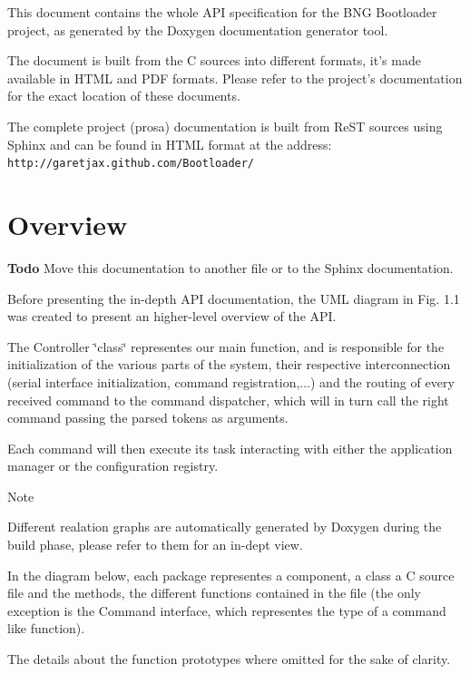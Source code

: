 This document contains the whole API specification for the BNG Bootloader project, as generated by the Doxygen documentation generator tool.

The document is built from the C sources into different formats, it's made available in HTML and PDF formats. Please refer to the project's documentation for the exact location of these documents.

The complete project (prosa) documentation is built from ReST sources using Sphinx and can be found in HTML format at the address: {\tt http://garetjax.github.com/Bootloader/}\section{Overview}\label{main_Overview}
\begin{Desc}
\item[{\bf Todo}]Move this documentation to another file or to the Sphinx documentation.\end{Desc}
Before presenting the in-\/depth API documentation, the UML diagram in Fig. 1.1 was created to present an higher-\/level overview of the API.

The {\ttfamily Controller} \char`\"{}class\char`\"{} representes our {\ttfamily main} function, and is responsible for the initialization of the various parts of the system, their respective interconnection (serial interface initialization, command registration,...) and the routing of every received command to the command dispatcher, which will in turn call the right command passing the parsed tokens as arguments.

Each command will then execute its task interacting with either the application manager or the configuration registry.

\begin{DoxyNote}{Note}

\begin{DoxyItemize}
\item Different realation graphs are automatically generated by Doxygen during the build phase, please refer to them for an in-\/dept view.
\item In the diagram below, each package representes a component, a class a C source file and the methods, the different functions contained in the file (the only exception is the {\ttfamily Command} interface, which representes the type of a command like function).
\item The details about the function prototypes where omitted for the sake of clarity.
\end{DoxyItemize}
\end{DoxyNote}
 
